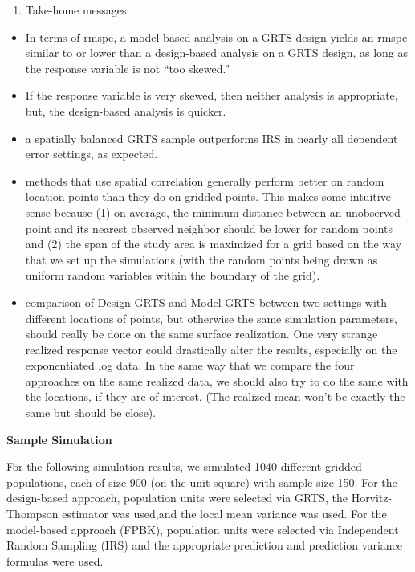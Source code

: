 \documentclass[]{elsarticle} %
\providecommand{\tightlist}{%
  \setlength{\itemsep}{0pt}\setlength{\parskip}{0pt}}
\begin{document}
\begin{enumerate}
\def\labelenumi{\arabic{enumi}.}
\setcounter{enumi}{4}
\tightlist
\item
  Take-home messages
\end{enumerate}

\begin{itemize}
\tightlist
\item
  In terms of rmspe, a model-based analysis on a GRTS design yields an
  rmspe similar to or lower than a design-based analysis on a GRTS
  design, as long as the response variable is not ``too skewed.''
\item
  If the response variable is very skewed, then neither analysis is
  appropriate, but, the design-based analysis is quicker.
\item
  a spatially balanced GRTS sample outperforms IRS in nearly all
  dependent error settings, as expected.
\item
  methods that use spatial correlation generally perform better on
  random location points than they do on gridded points. This makes some
  intuitive sense because (1) on average, the minimum distance between
  an unobserved point and its nearest observed neighbor should be lower
  for random points and (2) the span of the study area is maximized for
  a grid based on the way that we set up the simulations (with the
  random points being drawn as uniform random variables within the
  boundary of the grid).
\item
  comparison of Design-GRTS and Model-GRTS between two settings with
  different locations of points, but otherwise the same simulation
  parameters, should really be done on the same surface realization. One
  very strange realized response vector could drastically alter the
  results, especially on the exponentiated log data. In the same way
  that we compare the four approaches on the same realized data, we
  should also try to do the same with the locations, if they are of
  interest. (The realized mean won't be exactly the same but should be
  close).
\end{itemize}

\textbf{Sample Simulation}

For the following simulation results, we simulated 1040 different
gridded populations, each of size 900 (on the unit square) with sample
size 150. For the design-based approach, population units were selected
via GRTS, the Horvitz-Thompson estimator was used,and the local mean
variance was used. For the model-based approach (FPBK), population units
were selected via Independent Random Sampling (IRS) and the appropriate
prediction and prediction variance formulas were used.
\end{document}
